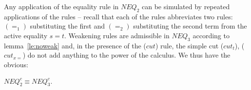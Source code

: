 \noindent
Any application of the equality rule  in $NEQ_2$ can be simulated
by repeated applications of the rules  -- recall that each of the rules
 abbreviates two rules: $(=_1)$ substituting the first and $(=_2)$
substituting the second term from the active equality $s=t$.
Weakening rules are admissible in $NEQ_3$ according to lemma~\ref{le:noweak} and, in
the presence of the ($cut$) rule, the simple cut ($cut_t$), ($cut_{x=}$) 
do not add anything to the power of the calculus. 
We thus have the obvious:
\begin{CLAIM}\label{le:neq2isneq3}
 $NEQ_2^c \equiv NEQ_3^c$.
\end{CLAIM}